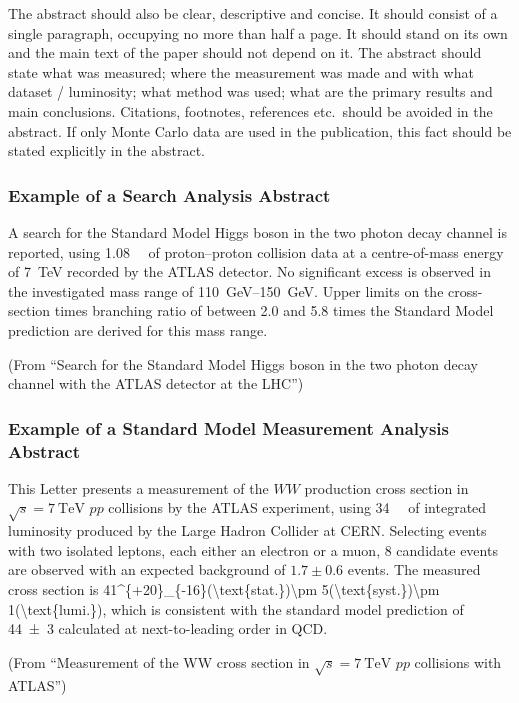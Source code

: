 \documentclass[PAPER,UKenglish,texlive=2014]{latex/atlasdoc}
\begin{document}
The abstract should also be clear, descriptive and concise. 
It should consist of a single paragraph, occupying no more than half a page. 
It should stand on its own and the main text of the paper should not depend on it. 
The abstract should state what was measured; where the measurement was made and with what dataset / luminosity;
what method was used; 
what are the primary results and main conclusions. 
Citations, footnotes, references etc.\ should be avoided in the abstract. 
If only Monte Carlo data are used in the publication, this fact should be stated explicitly in the abstract.  


\subsubsection*{Example of a Search Analysis Abstract}

A search for the Standard Model Higgs boson in the two photon decay channel is reported, 
using \SI{1.08}{\per\fb} of proton--proton collision data at a centre-of-mass energy of \SI{7}{\TeV} recorded by the ATLAS detector.
No significant excess is observed in the investigated mass range of \SIrange{110}{150}{\GeV}. 
Upper limits on the cross-section times branching ratio of between 2.0 and 5.8 times the Standard Model prediction are derived for this mass range.

\noindent(From \enquote{Search for the Standard Model Higgs boson in the two photon decay channel with the ATLAS detector at the LHC})

\subsubsection*{Example of a Standard Model Measurement Analysis Abstract}

This Letter presents a measurement of the $WW$ production cross section in $\sqrt{s} = \SI{7}{\TeV}$ $pp$ collisions by the ATLAS experiment, using \SI{34}{\per\pb} of integrated luminosity produced by the Large Hadron Collider at CERN. Selecting events with two isolated leptons, each either an electron or a muon, 8 candidate events are observed with an expected background of $1.7 \pm 0.6$ events.
The measured cross section is 
\SI[parse-numbers=false]{41^{+20}_{-16}(\text{stat.})\pm 5(\text{syst.})\pm 1(\text{lumi.})}{\pb}, 
which is consistent with the standard model prediction of \SI{44 \pm 3}{\pb} calculated at next-to-leading order in QCD. 

\noindent(From \enquote{Measurement of the WW cross section in $\sqrt{s} = \SI{7}{\TeV}$ $pp$ collisions with ATLAS})
\end{document}
